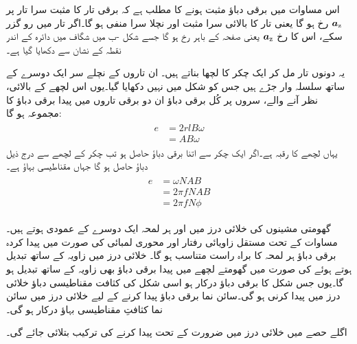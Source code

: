اس مساوات میں برقی دباؤ  مثبت ہونے کا مطلب ہے کہ برقی تار کا مثبت سرا تار پر  ${\boldsymbol{a}}_{\textup{z}}$ رخ ہو گا یعنی تار کا بالائی سرا مثبت اور نچلا  سرا منفی ہو گا۔اگر  تار میں  رو گزر سکے، اس کا رخ ${\boldsymbol{a}}_{\textup{z}}$ یعنی صفحہ کے    باہر رخ ہو گا جسے شکل -ب میں  شگاف میں دائرہ کے اندر نقطہ کے نشان سے دکھایا گیا ہے۔ 

یہ دونوں  تار مل کر ایک چکر کا لچھا بناتے ہیں۔ ان تاروں  کے نچلے سر ایک دوسرے کے ساتھ سلسلہ وار جڑے ہیں جس کو شکل  میں نہیں دکھایا گیا۔یوں اس لچھے کے بالائی،  نظر آنے والے،  سروں پر کُل برقی دباؤ  ان دو برقی تاروں میں پیدا برقی دباؤ  کا مجموعہ ہو گا:
\begin{gather}
\begin{aligned}
e&=2r l B \omega\\
&=A B \omega
\end{aligned}
\end{gather}
یہاں لچھے کا رقبہ   ہے۔اگر ایک چکر سے اتنا برقی دباؤ حاصل ہو تب  چکر کے لچھے  سے درج ذیل دباؤ حاصل ہو گا جہاں  مقناطیسی بہاؤ ہے۔
\begin{gather}
\begin{aligned}\label{مساوات_گھومتے_مشین_پیدا_دباو}
e&=\omega N A B\\
&=2 \pi f N A B\\
&=2 \pi f N \phi
\end{aligned}
\end{gather}

گھومتی مشینوں کی خلائی درز میں   اور   ہر لمحہ ایک دوسرے کے عمودی ہوتے ہیں۔مساوات   کے تحت مستقل زاویائی  رفتار اور محوری لمبائی کی صورت میں پیدا کردہ برقی دباؤ  ہر لمحہ   کا براہ راست متناسب ہو گا۔ خلائی درز میں زاویہ کے ساتھ  تبدیل ہوتے ہوئے  کی صورت میں گھومتے لچھے میں پیدا برقی دباؤ بھی زاویہ کے ساتھ تبدیل ہو گا۔یوں جس شکل کا برقی دباؤ درکار ہو اسی شکل کی کثافت مقناطیسی دباؤ خلائی درز میں پیدا کرنی ہو گی۔سائن نما برقی دباؤ پیدا کرنے کے لیے   خلائی درز میں  سائن نما کثافتِ مقناطیسی بہاؤ درکار ہو گی۔

اگلے حصے میں خلائی درز میں ضرورت کے تحت   پیدا کرنے کی ترکیب بتلائی جائے گی۔

